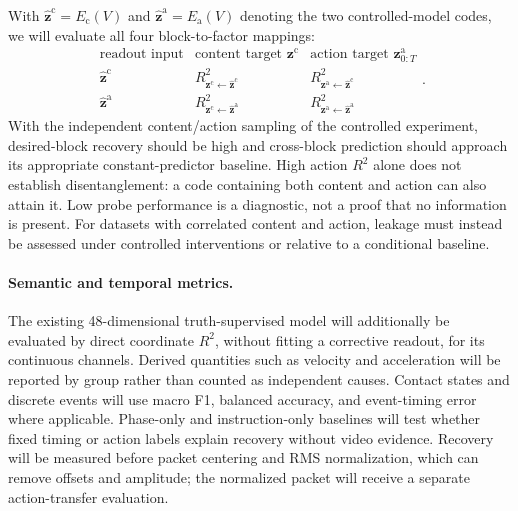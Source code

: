 With $\widehat{\mathbf z}^{\mathrm c}=E_{\mathrm c}(V)$ and $\widehat{\mathbf z}^{\mathrm a}=E_{\mathrm a}(V)$ denoting the two controlled-model
codes, we will evaluate all four block-to-factor mappings:
\begin{equation}
  \renewcommand{\arraystretch}{1.5}
  \begin{array}{c|cc}
    \text{readout input} & \text{content target } \mathbf z^{\mathrm c}
                         & \text{action target } \mathbf z^{\mathrm a}_{0:T}\\ \hline
    \widehat{\mathbf z}^{\mathrm c} & R^2_{\mathbf z^{\mathrm c}\leftarrow \widehat{\mathbf z}^{\mathrm c}} & R^2_{\mathbf z^{\mathrm a}\leftarrow \widehat{\mathbf z}^{\mathrm c}}\\
    \widehat{\mathbf z}^{\mathrm a} & R^2_{\mathbf z^{\mathrm c}\leftarrow \widehat{\mathbf z}^{\mathrm a}} & R^2_{\mathbf z^{\mathrm a}\leftarrow \widehat{\mathbf z}^{\mathrm a}}
  \end{array}.
  \label{eq:recovery-leakage-matrix}
\end{equation}
With the independent content/action sampling of the controlled experiment,
desired-block recovery should be high and cross-block prediction should
approach its appropriate constant-predictor baseline. High action
$R^2$ alone does not establish disentanglement: a code containing both
content and action can also attain it. Low probe performance is a
diagnostic, not a proof that no information is present.
For datasets with correlated content and action, leakage must instead
be assessed under controlled interventions or relative to a conditional
baseline.

\paragraph{Semantic and temporal metrics.}
The existing 48-dimensional truth-supervised model will additionally be
evaluated by direct coordinate $R^2$, without fitting a corrective
readout, for its continuous channels. Derived quantities such as
velocity and acceleration will be reported by group rather than
counted as independent causes. Contact states and discrete events will
use macro F1, balanced accuracy, and event-timing error where applicable.
Phase-only and instruction-only baselines will test whether fixed
timing or action labels explain recovery without video evidence.
Recovery will be measured before packet centering and RMS normalization,
which can remove offsets and amplitude; the normalized packet will
receive a separate action-transfer evaluation.

